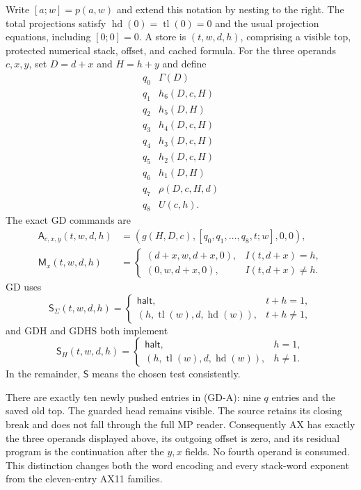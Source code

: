 Write $[a;w]=p(a,w)$ and extend this notation by nesting to the right.
The total projections satisfy
$\operatorname{hd}(0)=\operatorname{tl}(0)=0$ and the usual projection
equations, including $[0;0]=0$.  A store is $(t,w,d,h)$, comprising a
visible top, protected numerical stack, offset, and cached formula.
For the three operands $c,x,y$, set $D=d+x$ and $H=h+y$ and define
\[
\begin{array}{c|l}
q_0&\Gamma(D)\\
q_1&h_6(D,c,H)\\
q_2&h_5(D,H)\\
q_3&h_4(D,c,H)\\
q_4&h_3(D,c,H)\\
q_5&h_2(D,c,H)\\
q_6&h_1(D,H)\\
q_7&\rho(D,c,H,d)\\
q_8&U(c,h).
\end{array}
\]
The exact GD commands are
\begin{align*}
 \mathsf A_{c,x,y}(t,w,d,h)
   &=(g(H,D,c),[q_0,q_1,\ldots,q_8,t;w],0,0),
                                                        \tag{GD-A}\label{eq:gd-ax}\\
 \mathsf M_x(t,w,d,h)
   &=\begin{cases}
       (d+x,w,d+x,0),&I(t,d+x)=h,\\
       (0,w,d+x,0),&I(t,d+x)\ne h.
     \end{cases}                                       \tag{GD-M}\label{eq:gd-mp}
\end{align*}
GD uses
\[
 \mathsf S_\Sigma(t,w,d,h)=
 \begin{cases}
 \mathsf{halt},&t+h=1,\\
 (h,\operatorname{tl}(w),d,\operatorname{hd}(w)),&t+h\ne1,
 \end{cases}                                            \tag{GD-S}\label{eq:gd-sum}
\]
and GDH and GDHS both implement
\[
 \mathsf S_H(t,w,d,h)=
 \begin{cases}
 \mathsf{halt},&h=1,\\
 (h,\operatorname{tl}(w),d,\operatorname{hd}(w)),&h\ne1.
 \end{cases}                                            \tag{GD-H}\label{eq:gd-cache}
\]
In the remainder, $\mathsf S$ means the chosen test consistently.

There are exactly ten newly pushed entries in (GD-A): nine $q$ entries
and the saved old top.  The guarded head remains visible.  The source
retains its closing break and does not fall through the full MP reader.
Consequently AX has exactly the three operands displayed above, its
outgoing offset is zero, and its residual program is the continuation
after the $y,x$ fields.  No fourth operand is consumed.  This distinction
changes both the word encoding and every stack-word exponent from the
eleven-entry AX11 families.

